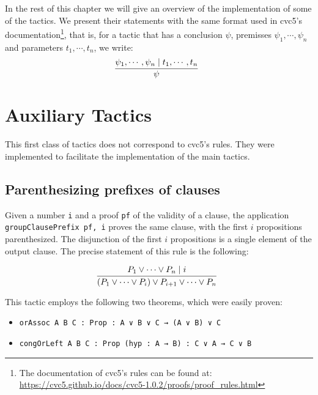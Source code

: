 In the rest of this chapter we will give an overview of the implementation of some of the
tactics. We present their statements with the same format used in cvc5's
documentation\footnote{The documentation of cvc5's rules can be found at:
  \url{https://cvc5.github.io/docs/cvc5-1.0.2/proofs/proof_rules.html}}, that is,
for a tactic that has a conclusion $\psi$, premisses $\psi_{1}, \cdots, \psi_{n}$ and
parameters $t_{1}, \cdots, t_{n}$, we write:
\[
  \infer[]{\psi}{\psi_{1}, \cdots, \psi_{n} \mid t_{1}, \cdots, t_{n}}
\]

\section{Auxiliary Tactics}

This first class of tactics does not correspond to cvc5's rules. They were implemented
to facilitate the implementation of the main tactics.



\subsection{Parenthesizing prefixes of clauses}

Given a number \texttt{i} and a proof \texttt{pf}
of the validity of a clause, the application \texttt{groupClausePrefix pf, i} proves the same clause, with the
first $i$ propositions parenthesized. The disjunction of the first $i$ propositions is a single element of the output clause.  The precise statement of this rule
is the following:

\[
  \infer[]{(P_{1} \vee \cdots \vee P_{i}) \vee P_{i + 1} \vee \cdots \vee P_{n}}
    {P_{1} \vee \cdots \vee P_{n} \mid i}
\]

This tactic employs the following two theorems, which were easily proven:

\begin{itemize}
  \item \texttt{orAssoc {A B C : Prop} : A ∨ B ∨ C → (A ∨ B) ∨ C}
  \item \texttt{congOrLeft {A B C : Prop} (hyp : A → B) : C ∨ A → C ∨ B}
\end{itemize}


